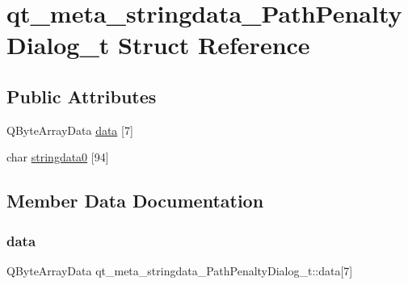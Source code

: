 \hypertarget{structqt__meta__stringdata___path_penalty_dialog__t}{}\section{qt\+\_\+meta\+\_\+stringdata\+\_\+\+Path\+Penalty\+Dialog\+\_\+t Struct Reference}
\label{structqt__meta__stringdata___path_penalty_dialog__t}
\subsection*{Public Attributes}
\begin{DoxyCompactItemize}
\item 
Q\+Byte\+Array\+Data \mbox{\hyperlink{structqt__meta__stringdata___path_penalty_dialog__t_a29bc2e53bf16f1636ca82800878db5a8}{data}} \mbox{[}7\mbox{]}
\item 
char \mbox{\hyperlink{structqt__meta__stringdata___path_penalty_dialog__t_a6f0970c0e2006059f11c4b2669a9bbba}{stringdata0}} \mbox{[}94\mbox{]}
\end{DoxyCompactItemize}


\subsection{Member Data Documentation}
\mbox{\label{structqt__meta__stringdata___path_penalty_dialog__t_a29bc2e53bf16f1636ca82800878db5a8}} 
\subsubsection{\texorpdfstring{data}{data}}
{\footnotesize\ttfamily Q\+Byte\+Array\+Data qt\+\_\+meta\+\_\+stringdata\+\_\+\+Path\+Penalty\+Dialog\+\_\+t\+::data\mbox{[}7\mbox{]}}

\mbox{\label{structqt__meta__stringdata___path_penalty_dialog__t_a6f0970c0e2006059f11c4b2669a9bbba}} 
